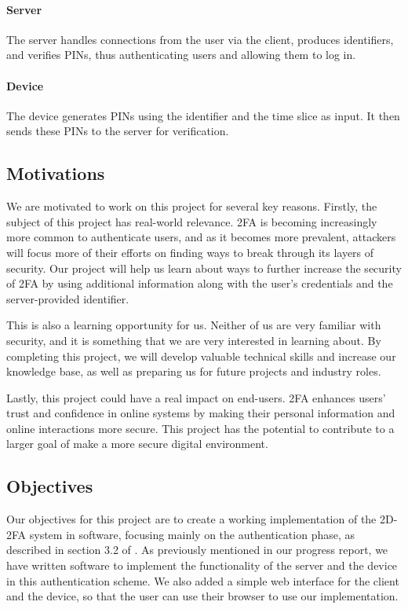 \documentclass[11pt]{article}
\begin{document}
\paragraph{Server} The server handles connections from the user via the
client, produces identifiers, and verifies PINs, thus authenticating
users and allowing them to log in.

\paragraph{Device} The device generates PINs using the identifier and the
time slice as input. It then sends these PINs to the server for
verification. 

\subsection{Motivations}

We are motivated to work on this project for several key reasons.
Firstly, the subject of this project has real-world relevance. 2FA is
becoming increasingly more common to authenticate users, and as it
becomes more prevalent, attackers will focus more of their efforts on
finding ways to break through its layers of security. Our project will
help us learn about ways to further increase the security of 2FA by
using additional information along with the user's credentials and the
server-provided identifier.

This is also a learning opportunity for us. Neither of us are very
familiar with security, and it is something that we are very interested
in learning about. By completing this project, we will develop valuable
technical skills and increase our knowledge base, as well as preparing
us for future projects and industry roles.

Lastly, this project could have a real impact on end-users. 2FA enhances
users' trust and confidence in online systems by making their personal
information and online interactions more secure. This project has the
potential to contribute to a larger goal of make a more secure digital
environment. 

\subsection{Objectives}

Our objectives for this project are to create a working implementation
of the 2D-2FA system in software, focusing mainly on the authentication
phase, as described in section 3.2 of \cite{shirvanian2d2fa}. As
previously mentioned in our progress report, we have written software to
implement the functionality of the server and the device in this
authentication scheme. We also added a simple web interface for the
client and the device, so that the user can use their browser to use our
implementation. 
\end{document}
